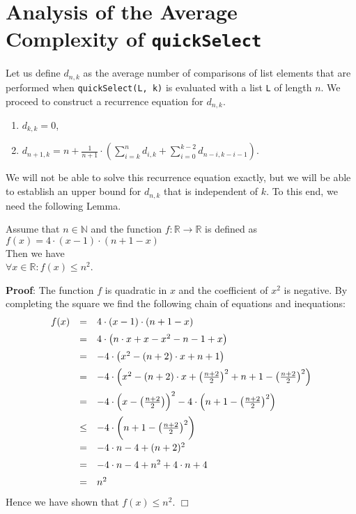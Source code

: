 \documentclass{article}
\newcommand{\blue}[1]{{\color{blue}#1}}
\newcommand{\ds}{\displaystyle}
\newcommand{\qed}{\hspace*{\fill} $\Box$ \vspace*{0.2cm}}
\begin{document}
\section{Analysis of the Average Complexity of \texttt{quickSelect}}
Let us define $d_{n,k}$ as the average number of comparisons of list elements that are performed when
\texttt{quickSelect(L, k)} is evaluated with a list \texttt{L} of length $n$.  We proceed to construct a
recurrence equation for $d_{n,k}$.
\begin{enumerate}
\item $\ds d_{k,k} = 0$,
\item $\ds d_{n+1,k} = n + \frac{1}{n+1} \cdot \left(\sum\limits_{i=k}^{n} d_{i,k} + \sum\limits_{i=0}^{k-2} d_{n-i,k-i-1} \right)$.
\end{enumerate}
We will not be able to solve this recurrence equation exactly, but we will be able to establish an upper bound
for $d_{n,k}$ that is independent of $k$.  To this end, we need the following Lemma.

\begin{Lemma}
Assume that $n\in \mathbb{N}$ and the function $f:\mathbb{R} \rightarrow \mathbb{R}$ is defined as
\\[0.2cm]
\hspace*{1.3cm}
$f(x) = 4 \cdot (x - 1) \cdot (n + 1 - x)$
\\[0.2cm]
Then we have 
\\[0.2cm]
\hspace*{1.3cm}
$\forall x \in \mathbb{R}: f(x) \leq n^2$.
\end{Lemma}

\noindent
\textbf{Proof}:  The function $f$ is quadratic in $x$ and the coefficient of $x^2$ is negative.  By
\blue{completing the square} we find the following chain of equations and inequations:
$$
\begin{array}{lcl}
  f(x) & = & 4 \cdot (x - 1) \cdot (n + 1 - x) \\[0.2cm]
       & = & 4 \cdot \bigl(n \cdot x + x - x^2 - n - 1 + x \bigr) \\[0.2cm]
       & = & - 4 \cdot \bigl(x^2 - (n + 2) \cdot x + n + 1 \bigr) \\[0.2cm]
       & = & - 4 \cdot \Bigl(x^2 - (n + 2) \cdot x + \bigl(\frac{n+2}{2}\bigr)^2  +
             n + 1 - \bigl(\frac{n+2}{2}\bigr)^2 \Bigr) \\[0.3cm]
       & = & - 4 \cdot \Bigl(x - \bigl(\frac{n+2}{2}\bigr)\Bigr)^2 
             - 4 \cdot\Bigl( n + 1 - \bigl(\frac{n+2}{2}\bigr)^2 \Bigr) \\[0.3cm]
       & \leq & -4 \cdot \biggl( n + 1 - \bigl(\frac{n+2}{2}\bigr)^2 \biggr) \\[0.3cm]
       & = & -4 \cdot n - 4 + (n + 2)^2  \\[0.2cm]
       & = & -4 \cdot n - 4 + n^2 + 4 \cdot n + 4 \\[0.2cm]
       & = & n^2
\end{array}
$$
Hence we have shown that $f(x) \leq n^2$. \qed
\end{document}
